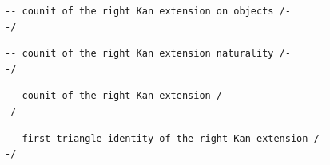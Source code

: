 \documentclass{book}
\theoremstyle{definition}
\newcounter{lcounter}
\begin{document}
\begin{center} \begin{tcolorbox}[width=5in,colback={white},title={\begin{center}\texttt{Lean \thelcounter} \addtocounter{lcounter}{1} \end{center}},colbacktitle=Blue,coltitle=black] \begin{verbatim}
-- counit of the right Kan extension on objects /-
-/
\end{verbatim} \end{tcolorbox} \end{center}

\begin{center} \begin{tcolorbox}[width=5in,colback={white},title={\begin{center}\texttt{Lean \thelcounter} \addtocounter{lcounter}{1} \end{center}},colbacktitle=Blue,coltitle=black] \begin{verbatim}
-- counit of the right Kan extension naturality /-
-/
\end{verbatim} \end{tcolorbox} \end{center}
\begin{center} \begin{tcolorbox}[width=5in,colback={white},title={\begin{center}\texttt{Lean \thelcounter} \addtocounter{lcounter}{1} \end{center}},colbacktitle=Blue,coltitle=black] \begin{verbatim}
-- counit of the right Kan extension /-
-/
\end{verbatim} \end{tcolorbox} \end{center}
\begin{center} \begin{tcolorbox}[width=5in,colback={white},title={\begin{center}\texttt{Lean \thelcounter} \addtocounter{lcounter}{1} \end{center}},colbacktitle=Blue,coltitle=black] \begin{verbatim}
-- first triangle identity of the right Kan extension /-
-/ \end{verbatim}

 \end{tcolorbox} \end{center}
\end{document}
